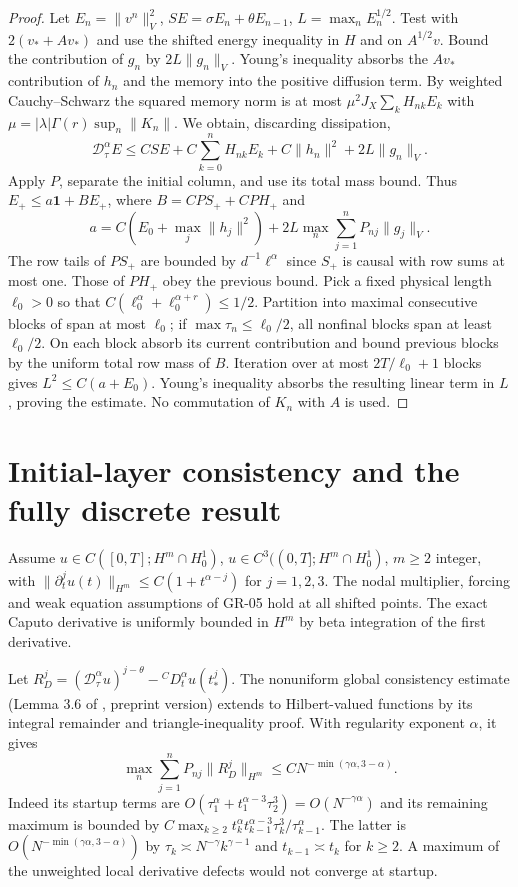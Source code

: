 \documentclass[11pt,a4paper]{article}
\newcommand{\norm}[1]{\lVert#1\rVert}
\newcommand{\D}{\mathcal D_\tau^\alpha}
\begin{document}
\begin{proof}
Let $E_n=\norm{v^n}_V^2$, $S E=\sigma E_n+\theta E_{n-1}$, $L=\max_nE_n^{1/2}$. Test with $2(v_*+Av_*)$ and use the shifted energy inequality in $H$ and on $A^{1/2}v$. Bound the contribution of $g_n$ by $2L\norm{g_n}_V$. Young's inequality absorbs the $Av_*$ contribution of $h_n$ and the memory into the positive diffusion term. By weighted Cauchy--Schwarz the squared memory norm is at most $\mu^2 J_X\sum_k H_{nk}E_k$ with $\mu=|\lambda|\Gamma(r)\sup_n\norm{K_n}$. We obtain, discarding dissipation,
\[
 \D E\le C SE+C\sum_{k=0}^n H_{nk}E_k+C\norm{h_n}^2+2L\norm{g_n}_V.
\]
Apply $P$, separate the initial column, and use its total mass bound. Thus $E_+\le a\mathbf 1+B E_+$, where $B=CPS_++CPH_+$ and
\[
 a=C(E_0+\max_j\norm{h_j}^2)+2L\max_n\sum_{j=1}^nP_{nj}\norm{g_j}_V.
\]
The row tails of $PS_+$ are bounded by $d^{-1}\ell^\alpha$ since $S_+$ is causal with row sums at most one. Those of $PH_+$ obey the previous bound. Pick a fixed physical length $\ell_0>0$ so that $C(\ell_0^\alpha+\ell_0^{\alpha+r})\le1/2$. Partition into maximal consecutive blocks of span at most $\ell_0$; if $\max\tau_n\le\ell_0/2$, all nonfinal blocks span at least $\ell_0/2$. On each block absorb its current contribution and bound previous blocks by the uniform total row mass of $B$. Iteration over at most $2T/\ell_0+1$ blocks gives $L^2\le C(a+E_0)$. Young's inequality absorbs the resulting linear term in $L$, proving the estimate. No commutation of $K_n$ with $A$ is used.
\end{proof}
\section{Initial-layer consistency and the fully discrete result}
Assume $u\in C([0,T];H^m\cap H_0^1)$, $u\in C^3((0,T];H^m\cap H_0^1)$, $m\ge2$ integer, with $\norm{\partial_t^j u(t)}_{H^m}\le C(1+t^{\alpha-j})$ for $j=1,2,3$. The nodal multiplier, forcing and weak equation assumptions of GR-05 hold at all shifted points. The exact Caputo derivative is uniformly bounded in $H^m$ by beta integration of the first derivative.

Let $R_D^j=(\D u)^{j-\theta}-{}^CD_t^\alpha u(t_*^j)$. The nonuniform global consistency estimate (Lemma 3.6 of \cite{lmz}, preprint version) extends to Hilbert-valued functions by its integral remainder and triangle-inequality proof. With regularity exponent $\alpha$, it gives
\[
 \max_n\sum_{j=1}^nP_{nj}\norm{R_D^j}_{H^m}\le C N^{-\min(\gamma\alpha,3-\alpha)}.
\]
Indeed its startup terms are $O(\tau_1^\alpha+t_1^{\alpha-3}\tau_2^3)=O(N^{-\gamma\alpha})$ and its remaining maximum is bounded by $C\max_{k\ge2} t_k^\alpha t_{k-1}^{\alpha-3}\tau_k^3/\tau_{k-1}^\alpha$. The latter is $O(N^{-\min(\gamma\alpha,3-\alpha)})$ by $\tau_k\asymp N^{-\gamma} k^{\gamma-1}$ and $t_{k-1}\asymp t_k$ for $k\ge2$. A maximum of the unweighted local derivative defects would not converge at startup.
\end{document}
